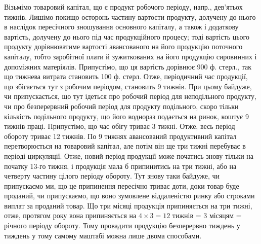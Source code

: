 Візьмімо товаровий капітал, що є продукт робочого періоду, напр.,
дев’ятьох тижнів. Лишімо покищо осторонь частину вартости продукту,
долучену до нього в наслідок пересічного зношування основного капіталу,
а також і додаткову вартість, долучену до нього під час продукційного
процесу; тоді вартість цього продукту дорівнюватиме вартості
авансованого на його продукцію поточного капіталу, тобто заробітної плати
й зужиткованих на його продукцію сировинних і допоміжних матеріялів.
Припустімо, що ця вартість дорівнює 900 ф. стерл., так що тижнева
витрата становить 100 ф. стерл. Отже, періодичний час продукції, що
збігається тут з робочим періодом, становить 9 тижнів. При цьому байдуже,
чи припускається, що тут ідеться про робочий період для неподільного
продукту, чи про безперервний робочий період для продукту
подільного, скоро тільки кількість подільного продукту, що його воднораз
подається на ринок, коштує 9 тижнів праці. Припустімо, що час
обігу триває 3 тижні. Отже, весь період обороту триває 12 тижнів.
По 9 тижнях авансований продуктивний капітал перетворюється на товаровий
капітал, але потім він ще три тижні перебуває в періоді циркуляції.
Отже, новий період продукції може початись знову тільки на початку
13-го тижня, і продукція мала б припинитись на три тижні, або на
четверту частину цілого періоду обороту. Тут знову таки байдуже, чи
припускаємо ми, що це припинення пересічно триває доти, доки товар
буде проданий, чи припускаємо, що воно зумовлене віддаленістю ринку
або строками виплат за проданий товар. Що три місяці продукція
припиняється на три тижні, отже, протягом року вона припиняється на
$4×3 = 12$ тижнів = 3 місяцям =  річного періоду обороту. Тому
провадити продукцію безперервно тиждень у тиждень у тому самому
маштабі можна лише двома способами.


